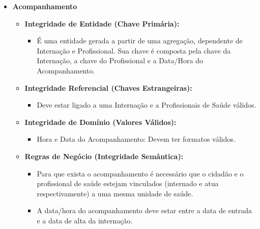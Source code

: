 \documentclass[12pt, a4paper]{article}
\begin{document}
\begin{itemize}
    \item \textbf{Acompanhamento}
    \begin{itemize}
        \item \textbf{Integridade de Entidade (Chave Primária):}
        \begin{itemize}
            \item É uma entidade gerada a partir de uma agregação, dependente de Internação e Profissional. Sua chave é composta pela chave da Internação, a chave do Profissional e a Data/Hora do Acompanhamento.
        \end{itemize}
        \item \textbf{Integridade Referencial (Chaves Estrangeiras):}
        \begin{itemize}
            \item Deve estar ligado a uma Internação e a Profissionais de Saúde válidos.
        \end{itemize}
        \item \textbf{Integridade de Domínio (Valores Válidos):}
        \begin{itemize}
            \item Hora e Data do Acompanhamento: Devem ter formatos válidos.
        \end{itemize}
        \item \textbf{Regras de Negócio (Integridade Semântica):}
        \begin{itemize}
            \item Para que exista o acompanhamento é necessário que o cidadão e o profissional de saúde estejam vinculados (internado e atua respectivamente) a uma mesma unidade de saúde.
            \item A data/hora do acompanhamento deve estar entre a data de entrada e a data de alta da internação.
        \end{itemize}
    \end{itemize}
\end{itemize}
\end{document}
